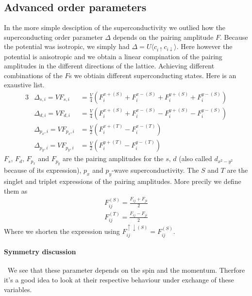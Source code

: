 \documentclass[../main.tex]{subfile}
\begin{document}
\subsection{Advanced order parameters}
In the more simple desciption of the superconductivity we outlied how the superconducting order parameter $\Delta$ depends on the pairing amplitude $F$.
Because the potential was isotropic, we simply had $\Delta = U \langle c_{i\uparrow}c_{i\downarrow}\rangle$. Here however the potential is anisotropic 
and we obtain a linear compination of the pairing amplitudes in the different directions of the lattice. Achieving different combinations of the $F$s 
we obtiain different superconducting states. Here is an exaustive list. 
\begin{alignat}{3}
    &\Delta_{s,i} = V F_{s,i} &= \frac{V}{4} \left(F_{i}^{x+(S)} + F_{i}^{x-(S)} + F_{i}^{y+(S)} + F_{i}^{y-(S)}\right)\\
    &\Delta_{d,i} = V F_{d,i} &= \frac{V}{4} \left(F_{i}^{x+(S)} + F_{i}^{x-(S)} - F_{i}^{y+(S)} - F_{i}^{y-(S)}\right)\\
    &\Delta_{p_x,i} = V F_{p_x,i} &= \frac{V}{2} \left(F_{i}^{x+(T)} - F_{i}^{x-(T)}\right)\\
    &\Delta_{p_y,i} = V F_{p_y,i} &= \frac{V}{2} \left(F_{i}^{y+(T)} - F_{i}^{y-(T)}\right)
\end{alignat}
$F_s$, $F_d$, $F_{p_x}$ and $F_{p_y}$ are the pairing amplitudes for the $s$, $d$ (also called $d_{x^2-y^2}$ because of its expression), $p_x$ and $p_y$-wave superconductivity.
The $S$ and $T$ are the singlet and triplet expressions of the pairing amplitudes. More precily we define them as
\begin{align}
    F_{ij}^{(S)} = \frac{F_{ij} + F_{ji}}{2}\\
    F_{ij}^{(T)} = \frac{F_{ij} - F_{ji}}{2}
\end{align}
Where we shorten the expression using $F_{ij}^{\uparrow\downarrow(S)} = F_{ij}^{(S)}$.
\paragraph{Symmetry discussion} $~$ We see that these parameter depends on the spin and the momentum. Therfore it's a good idea to look at their respective
behaviour under exchange of these variables.\\
\end{document}
